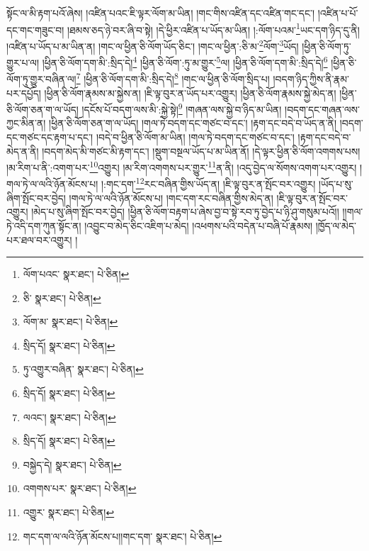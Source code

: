 སྟོང་ལ་མི་རྟག་པའོ་ཞེས། །འཛིན་པའང་ཇི་ལྟར་ལོག་མ་ཡིན། །གང་གིས་འཛིན་དང་འཛིན་གང་དང་། །འཛིན་པ་པོ་དང་གང་གཟུང་བ། །ཐམས་ཅད་ཉེ་བར་ཞི་བ་སྟེ། །དེ་ཕྱིར་འཛིན་པ་ཡོད་མ་ཡིན། །:ལོག་པའམ་\footnote{ལོག་པའང་  སྣར་ཐང་།  པེ་ཅིན། }ཡང་དག་ཉིད་དུ་ནི། །འཛིན་པ་ཡོད་པ་མ་ཡིན་ན། །གང་ལ་ཕྱིན་ཅི་ལོག་ཡོད་ཅིང་། །གང་ལ་ཕྱིན་:ཅི་མ་\footnote{ཅི་  སྣར་ཐང་།  པེ་ཅིན། }ལོག་\footnote{ལོག་མ་  སྣར་ཐང་།  པེ་ཅིན། }ཡོད། །ཕྱིན་ཅི་ལོག་ཏུ་གྱུར་པ་ལ། །ཕྱིན་ཅི་ལོག་དག་མི་:སྲིད་དེ།\footnote{སྲིད་དོ།  སྣར་ཐང་།  པེ་ཅིན། } །ཕྱིན་ཅི་ལོག་:ཏུ་མ་གྱུར་\footnote{ཏུ་འགྱུར་བཞིན་  སྣར་ཐང་།  པེ་ཅིན། }ལ། །ཕྱིན་ཅི་ལོག་དག་མི་:སྲིད་དེ།\footnote{སྲིད་དོ།  སྣར་ཐང་།  པེ་ཅིན། } །ཕྱིན་ཅི་ལོག་ཏུ་གྱུར་བཞིན་ལ།\footnote{ལའང་།  སྣར་ཐང་།  པེ་ཅིན། } །ཕྱིན་ཅི་ལོག་དག་མི་:སྲིད་དེ།\footnote{སྲིད་དོ།  སྣར་ཐང་།  པེ་ཅིན། } །གང་ལ་ཕྱིན་ཅི་ལོག་སྲིད་པ། །བདག་ཉིད་ཀྱིས་ནི་རྣམ་པར་དཔྱོད། །ཕྱིན་ཅི་ལོག་རྣམས་མ་སྐྱེས་ན། །ཇི་ལྟ་བུར་ན་ཡོད་པར་འགྱུར། །ཕྱིན་ཅི་ལོག་རྣམས་སྐྱེ་མེད་ན། །ཕྱིན་ཅི་ལོག་ཅན་ག་ལ་ཡོད། །དངོས་པོ་བདག་ལས་མི་:སྐྱེ་སྟེ།\footnote{བསྐྱེད་དེ།  སྣར་ཐང་།  པེ་ཅིན། } །གཞན་ལས་སྐྱེ་བ་ཉིད་མ་ཡིན། །བདག་དང་གཞན་ལས་ཀྱང་མིན་ན། །ཕྱིན་ཅི་ལོག་ཅན་ག་ལ་ཡོད། །གལ་ཏེ་བདག་དང་གཙང་བ་དང་། །རྟག་དང་བདེ་བ་ཡོད་ན་ནི། །བདག་དང་གཙང་དང་རྟག་པ་དང་། །བདེ་བ་ཕྱིན་ཅི་ལོག་མ་ཡིན། །གལ་ཏེ་བདག་དང་གཙང་བ་དང་། །རྟག་དང་བདེ་བ་མེད་ན་ནི། །བདག་མེད་མི་གཙང་མི་རྟག་དང་། །སྡུག་བསྔལ་ཡོད་པ་མ་ཡིན་ནོ། །དེ་ལྟར་ཕྱིན་ཅི་ལོག་འགགས་པས། །མ་རིག་པ་ནི་:འགག་པར་\footnote{འགགས་པར་  སྣར་ཐང་།  པེ་ཅིན། }འགྱུར། །མ་རིག་འགགས་པར་གྱུར་\footnote{འགྱུར་  སྣར་ཐང་།  པེ་ཅིན། }ན་ནི། །འདུ་བྱེད་ལ་སོགས་འགག་པར་འགྱུར། །གལ་ཏེ་ལ་ལའི་ཉོན་མོངས་པ། །:གང་དག་\footnote{གང་དག་ལ་ལའི་ཉོན་མོངས་པ།།གང་དག་  སྣར་ཐང་།  པེ་ཅིན། }རང་བཞིན་གྱིས་ཡོད་ན། །ཇི་ལྟ་བུར་ན་སྤོང་བར་འགྱུར། །ཡོད་པ་སུ་ཞིག་སྤོང་བར་བྱེད། །གལ་ཏེ་ལ་ལའི་ཉོན་མོངས་པ། །གང་དག་རང་བཞིན་གྱིས་མེད་ན། །ཇི་ལྟ་བུར་ན་སྤོང་བར་འགྱུར། །མེད་པ་སུ་ཞིག་སྤོང་བར་བྱེད། །ཕྱིན་ཅི་ལོག་བརྟག་པ་ཞེས་བྱ་བ་སྟེ་རབ་ཏུ་བྱེད་པ་ཉི་ཤུ་གསུམ་པའོ།། །།གལ་ཏེ་འདི་དག་ཀུན་སྟོང་ན། །འབྱུང་བ་མེད་ཅིང་འཇིག་པ་མེད། །འཕགས་པའི་བདེན་པ་བཞི་པོ་རྣམས། །ཁྱོད་ལ་མེད་པར་ཐལ་བར་འགྱུར། །
